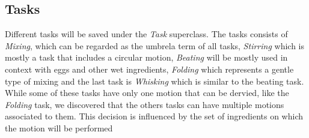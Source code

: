 \subsection{Tasks}
Different tasks will be saved under the \textit{Task} superclass. The tasks consists of \textit{Mixing}, which can be regarded as the umbrela term of all tasks, \textit{Stirring} which is mostly a task that includes a circular motion, \textit{Beating} will be mostly used in context with eggs and other wet ingredients, \textit{Folding} which represents a gentle type of mixing and the last task is \textit{Whisking} which is similar to the beating task.
While some of these tasks have only one motion that can be dervied, like the \textit{Folding} task, we discovered that the others tasks can have multiple motions associated to them. This decision is influenced by the set of ingredients on which the motion will be performed

